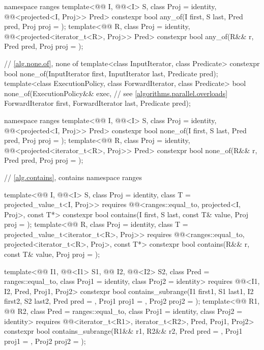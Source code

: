 \begin{codeblock}
{  namespace ranges {
    template<@@ I, @@<I> S, class Proj = identity,
             @@<projected<I, Proj>> Pred>
      constexpr bool any_of(I first, S last, Pred pred, Proj proj = {});
    template<@@ R, class Proj = identity,
             @@<projected<iterator_t<R>, Proj>> Pred>
      constexpr bool any_of(R&& r, Pred pred, Proj proj = {});
  }

  // \ref{alg.none.of}, none of
  template<class InputIterator, class Predicate>
    constexpr bool none_of(InputIterator first, InputIterator last, Predicate pred);
  template<class ExecutionPolicy, class ForwardIterator, class Predicate>
    bool none_of(ExecutionPolicy&& exec,                        // see \ref{algorithms.parallel.overloads}
                 ForwardIterator first, ForwardIterator last, Predicate pred);

  namespace ranges {
    template<@@ I, @@<I> S, class Proj = identity,
             @@<projected<I, Proj>> Pred>
      constexpr bool none_of(I first, S last, Pred pred, Proj proj = {});
    template<@@ R, class Proj = identity,
             @@<projected<iterator_t<R>, Proj>> Pred>
      constexpr bool none_of(R&& r, Pred pred, Proj proj = {});
  }

  // \ref{alg.contains}, contains
  namespace ranges {
    template<@@ I, @@<I> S, class Proj = identity,
             class T = projected_value_t<I, Proj>>
      requires @@<ranges::equal_to, projected<I, Proj>, const T*>
      constexpr bool contains(I first, S last, const T& value, Proj proj = {});
    template<@@ R, class Proj = identity,
             class T = projected_value_t<iterator_t<R>, Proj>>
      requires
        @@<ranges::equal_to, projected<iterator_t<R>, Proj>, const T*>
      constexpr bool contains(R&& r, const T& value, Proj proj = {});

    template<@@ I1, @@<I1> S1,
             @@ I2, @@<I2> S2,
             class Pred = ranges::equal_to, class Proj1 = identity, class Proj2 = identity>
      requires @@<I1, I2, Pred, Proj1, Proj2>
      constexpr bool contains_subrange(I1 first1, S1 last1, I2 first2, S2 last2,
                                       Pred pred = {}, Proj1 proj1 = {}, Proj2 proj2 = {});
    template<@@ R1, @@ R2,
             class Pred = ranges::equal_to, class Proj1 = identity, class Proj2 = identity>
      requires @@<iterator_t<R1>, iterator_t<R2>, Pred, Proj1, Proj2>
      constexpr bool contains_subrange(R1&& r1, R2&& r2,
                                       Pred pred = {}, Proj1 proj1 = {}, Proj2 proj2 = {});
  }

}
\end{codeblock}
